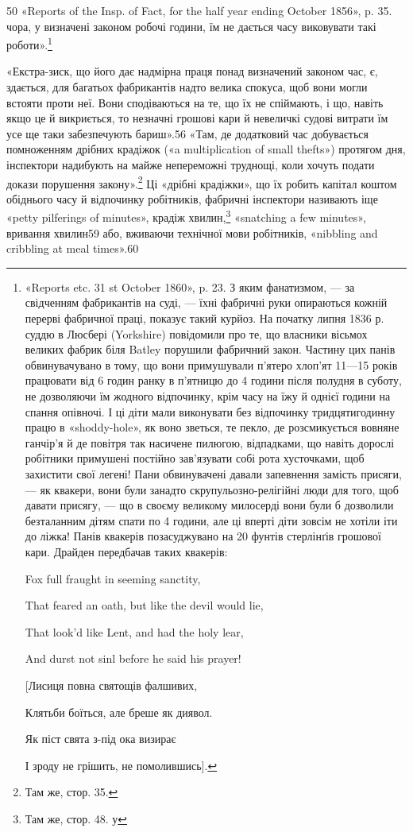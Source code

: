 50 «Reports of the Insp. of Fact, for the half year ending October 1856»,
p. 35.
чора, у визначені законом робочі години, їм не дається часу виковувати
такі роботи».\footnote{
«Reports etc. 31 st October 1860», p. 23. З яким фанатизмом, — за
свідченням фабрикантів на суді, — їхні фабричні руки опираються кожній
перерві фабричної праці, показує такий курйоз. На початку липня 1836 р.
суддю в Люсбері (Yorkshire) повідомили про те, що власники вісьмох великих
фабрик біля Batley порушили фабричний закон. Частину цих панів
обвинувачувано в тому, що вони примушували п’ятеро хлоп’ят 11—15 років
працювати від 6 годин ранку в п’ятницю до 4 години після полудня
в суботу, не дозволяючи їм жодного відпочинку, крім часу на їжу й однієї
години на спання опівночі. І ці діти мали виконувати без відпочинку тридцятигодинну
працю в «shoddy-hole», як воно зветься, те пекло, де розсмикується
вовняне ганчір’я й де повітря так насичене пилюгою, відпадками,
що навіть дорослі робітники примушені постійно зав’язувати собі рота
хусточками, щоб захистити свої легені! Пани обвинувачені давали запевнення
замість присяги, — як квакери, вони були занадто скрупульозно-релігійні
люди для того, щоб давати присягу, — що в своєму великому
милосерді вони були б дозволили безталанним дітям спати по 4 години,
але ці вперті діти зовсім не хотіли іти до ліжка! Панів квакерів
позасуджувано на 20 фунтів стерлінґів грошової кари. Драйден передбачав
таких квакерів:

Fox full fraught in seeming sanctity,

That feared an oath, but like the devil would lie,

That look’d like Lent, and had the holy lear,

And durst not sinl before he said his prayer!

[Лисиця повна святощів фалшивих,

Клятьби боїться, але бреше як диявол.

Як піст свята з-під ока визирає

І зроду не грішить, не помолившись].
}

«Екстра-зиск, що його дає надмірна праця понад визначений
законом час, є, здається, для багатьох фабрикантів надто
велика спокуса, щоб вони могли встояти проти неї. Вони сподіваються
на те, що їх не спіймають, і що, навіть якщо це й
викриється, то незначні грошові кари й невеличкі судові витрати
їм усе ще таки забезпечують бариш».56 «Там, де додатковий
час добувається помноженням дрібних крадіжок («a multiplication
of small thefts») протягом дня, інспектори надибують на
майже непереможні труднощі, коли хочуть подати докази порушення
закону».\footnote{
Там же, стор. 35.
} Ці «дрібні крадіжки», що їх робить капітал
коштом обіднього часу й відпочинку робітників, фабричні інспектори
називають іще «petty pilferings of minutes», крадіж хвилин,\footnote{
Там же, стор. 48. у
}
«snatching a few minutes», вривання хвилин59 або, вживаючи технічної
мови робітників, «nibbling and cribbling at meal times».60

